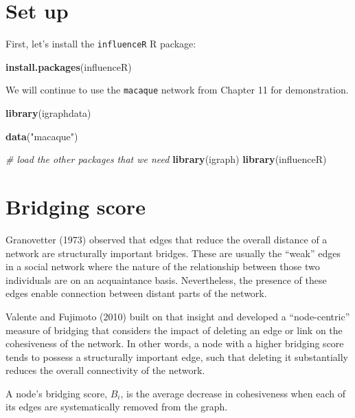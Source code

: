 \documentclass[
]{book}
\newenvironment{Shaded}{\begin{snugshade}}{\end{snugshade}}
\newcommand{\CommentTok}[1]{\textcolor[rgb]{0.56,0.35,0.01}{\textit{#1}}}
\newcommand{\FunctionTok}[1]{\textcolor[rgb]{0.13,0.29,0.53}{\textbf{#1}}}
\newcommand{\NormalTok}[1]{#1}
\newcommand{\StringTok}[1]{\textcolor[rgb]{0.31,0.60,0.02}{#1}}
\begin{document}
\section{Set up}\label{set-up-2}

First, let's install the \texttt{influenceR} R package:

\begin{Shaded}
\begin{Highlighting}[]
\FunctionTok{install.packages}\NormalTok{(}\StringTok{\textquotesingle{}influenceR\textquotesingle{}}\NormalTok{)}
\end{Highlighting}
\end{Shaded}

We will continue to use the \texttt{macaque} network from Chapter 11 for demonstration.

\begin{Shaded}
\begin{Highlighting}[]
\FunctionTok{library}\NormalTok{(igraphdata)}

\FunctionTok{data}\NormalTok{(}\StringTok{"macaque"}\NormalTok{)}

\CommentTok{\# load the other packages that we need }
\FunctionTok{library}\NormalTok{(igraph)}
\FunctionTok{library}\NormalTok{(influenceR)}
\end{Highlighting}
\end{Shaded}

\section{Bridging score}\label{bridging-score}

Granovetter (1973) observed that edges that reduce the overall distance of a network are structurally important bridges. These are usually the ``weak'' edges in a social network where the nature of the relationship between those two individuals are on an acquaintance basis. Nevertheless, the presence of these edges enable connection between distant parts of the network.

Valente and Fujimoto (2010) built on that insight and developed a ``node-centric'' measure of bridging that considers the impact of deleting an edge or link on the cohesiveness of the network. In other words, a node with a higher bridging score tends to possess a structurally important edge, such that deleting it substantially reduces the overall connectivity of the network.

A node's bridging score, \(B_i\), is the average decrease in cohesiveness when each of its edges are systematically removed from the graph.
\end{document}
